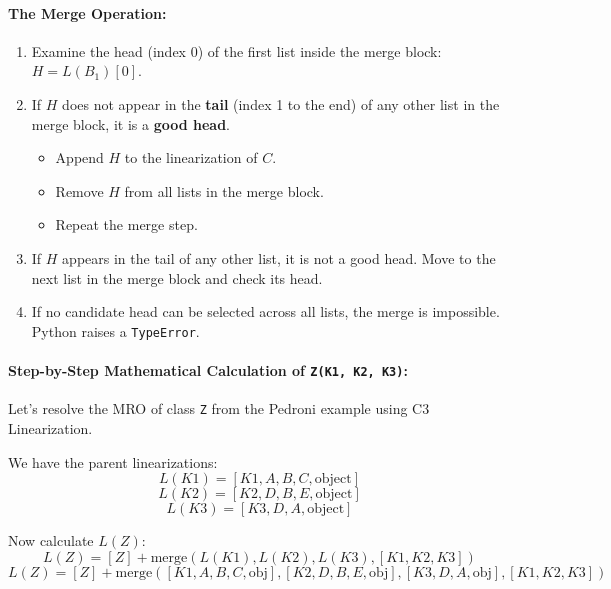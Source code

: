 \hypertarget{the-merge-operation}{%
\paragraph{The Merge Operation:}\label{the-merge-operation}}

\begin{enumerate}
\def\labelenumi{\arabic{enumi}.}
\tightlist
\item
  Examine the head (index 0) of the first list inside the merge block:
  \(H = L(B_1)[0]\).
\item
  If \(H\) does not appear in the \textbf{tail} (index 1 to the end) of
  any other list in the merge block, it is a \textbf{good head}.

  \begin{itemize}
  \tightlist
  \item
    Append \(H\) to the linearization of \(C\).
  \item
    Remove \(H\) from all lists in the merge block.
  \item
    Repeat the merge step.
  \end{itemize}
\item
  If \(H\) appears in the tail of any other list, it is not a good head.
  Move to the next list in the merge block and check its head.
\item
  If no candidate head can be selected across all lists, the merge is
  impossible. Python raises a \passthrough{\lstinline!TypeError!}.
\end{enumerate}

\hypertarget{step-by-step-mathematical-calculation-of-zk1-k2-k3}{%
\paragraph{\texorpdfstring{Step-by-Step Mathematical Calculation of
\texttt{Z(K1,\ K2,\ K3)}:}{Step-by-Step Mathematical Calculation of Z(K1, K2, K3):}}\label{step-by-step-mathematical-calculation-of-zk1-k2-k3}}

Let's resolve the MRO of class \passthrough{\lstinline!Z!} from the
Pedroni example using C3 Linearization.

We have the parent linearizations:
\[L(K1) = [K1, A, B, C, \text{object}]\]
\[L(K2) = [K2, D, B, E, \text{object}]\]
\[L(K3) = [K3, D, A, \text{object}]\]

Now calculate \(L(Z)\):
\[L(Z) = [Z] + \text{merge}\left(L(K1), L(K2), L(K3), [K1, K2, K3]\right)\]
\[L(Z) = [Z] + \text{merge}\left([K1, A, B, C, \text{obj}], [K2, D, B, E, \text{obj}], [K3, D, A, \text{obj}], [K1, K2, K3]\right)\]

